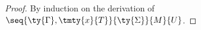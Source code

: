 \begin{proof}
  By induction on the derivation of $\seq{\ty{\Gamma},\tmty{x}{T}}{\ty{\Sigma}}{M}{U}$.







\end{proof}
